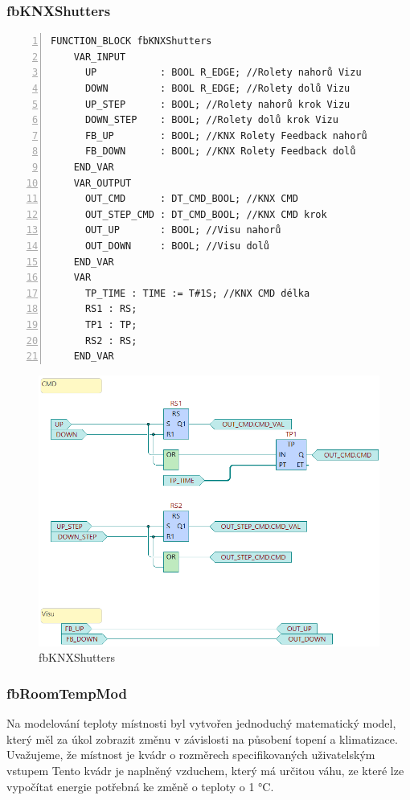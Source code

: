 \subsubsection{fbKNXShutters}
\begin{lstlisting}[language=ST, breaklines=true, numbers=left, numberstyle=\small, numbersep=10pt, frame=single, basicstyle=\ttfamily\small, caption={Definice funkčního bloku fbKNXShutters}, label={lst:fbKNXShutters}]
    FUNCTION_BLOCK fbKNXShutters
    VAR_INPUT
      UP           : BOOL R_EDGE; //Rolety nahorů Vizu
      DOWN         : BOOL R_EDGE; //Rolety dolů Vizu
      UP_STEP      : BOOL; //Rolety nahorů krok Vizu
      DOWN_STEP    : BOOL; //Rolety dolů krok Vizu
      FB_UP        : BOOL; //KNX Rolety Feedback nahorů
      FB_DOWN      : BOOL; //KNX Rolety Feedback dolů
    END_VAR
    VAR_OUTPUT
      OUT_CMD      : DT_CMD_BOOL; //KNX CMD
      OUT_STEP_CMD : DT_CMD_BOOL; //KNX CMD krok
      OUT_UP       : BOOL; //Visu nahorů
      OUT_DOWN     : BOOL; //Visu dolů
    END_VAR
    VAR
      TP_TIME : TIME := T#1S; //KNX CMD délka
      RS1 : RS;
      TP1 : TP;
      RS2 : RS;
    END_VAR
\end{lstlisting}

\begin{figure}[!ht]
    \begin{center}
        \includegraphics[scale=0.7]{obrazky/fbKNXShutters.png}
    \end{center}
    \caption[fbKNXShutters]{fbKNXShutters}
    \label{fig:fbKNXShutters}
\end{figure}
\subsubsection{fbRoomTempMod}
Na modelování teploty místnosti byl vytvořen jednoduchý matematický model, který měl za úkol zobrazit změnu v závislosti na působení topení a klimatizace.
Uvažujeme, že místnost je kvádr o rozměrech specifikovaných uživatelským vstupem Tento kvádr je naplněný vzduchem, který má určitou váhu, ze které lze vypočítat energie potřebná ke změně o teploty o 1 °C.

